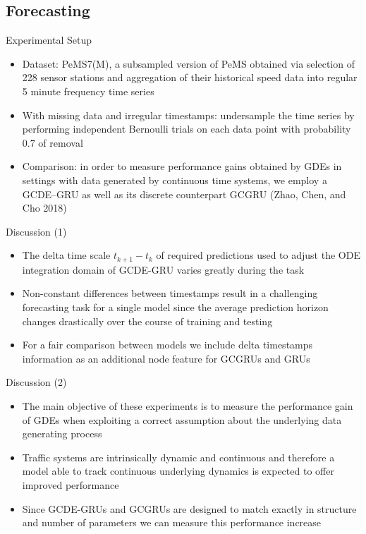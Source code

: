 \documentclass{beamer}
\begin{document}
\subsection{Forecasting}
\begin{frame}{Experimental Setup}
\begin{itemize}
\item Dataset: PeMS7(M), a subsampled version of PeMS obtained via selection of 228 sensor stations and aggregation of their historical speed data into regular 5 minute frequency time series
\item With missing data and irregular timestamps:  undersample the time series by performing independent Bernoulli trials on each data point with probability $0.7$ of removal
\item Comparison: in order to measure performance gains obtained by GDEs in settings with data generated by continuous time systems, we employ a GCDE–GRU as well as its discrete counterpart GCGRU (Zhao, Chen, and Cho 2018)
\end{itemize}
\end{frame}

\begin{frame}{Discussion (1)}
\begin{itemize}
\item The delta time scale $t_{k+1}-t_k$ of required predictions used to adjust the ODE integration domain of GCDE-GRU varies greatly during the task
\item Non-constant differences between timestamps result in a challenging forecasting task for a single model since the average prediction horizon changes drastically over the course of training and testing
\item For a fair comparison between models we include delta timestamps information as an additional node feature for GCGRUs and GRUs
\end{itemize}
\end{frame}

\begin{frame}{Discussion (2)}
\begin{itemize}
\item The main objective of these experiments is to measure the performance gain of GDEs when exploiting a correct assumption about the underlying data generating process
\item Traffic systems are intrinsically dynamic and continuous and therefore a model able to track continuous underlying dynamics is expected to offer improved performance
\item Since GCDE-GRUs and GCGRUs are designed to match exactly in structure and number of parameters we can measure this performance increase
\end{itemize}
\end{frame}
\end{document}
